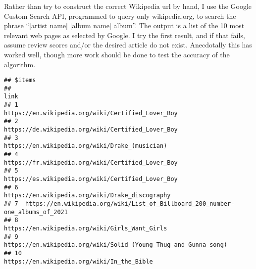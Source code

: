 \documentclass[
  11pt,
]{article}
\newenvironment{Shaded}{\begin{snugshade}}{\end{snugshade}}
\newcommand{\FunctionTok}[1]{\textcolor[rgb]{0.00,0.00,0.00}{#1}}
\newcommand{\NormalTok}[1]{#1}
\newcommand{\OtherTok}[1]{\textcolor[rgb]{0.56,0.35,0.01}{#1}}
\newcommand{\SpecialCharTok}[1]{\textcolor[rgb]{0.00,0.00,0.00}{#1}}
\newcommand{\StringTok}[1]{\textcolor[rgb]{0.31,0.60,0.02}{#1}}
\begin{document}
Rather than try to construct the correct Wikipedia url by hand, I use
the Google Custom Search API, programmed to query only wikipedia.org, to
search the phrase ``{[}artist name{]} {[}album name{]} album''. The
output is a list of the 10 most relevant web pages as selected by
Google. I try the first result, and if that fails, assume review scores
and/or the desired article do not exist. Anecdotally this has worked
well, though more work should be done to test the accuracy of the
algorithm.

\begin{Shaded}
\end{Shaded}

\begin{verbatim}
## $items
##                                                                             link
## 1                              https://en.wikipedia.org/wiki/Certified_Lover_Boy
## 2                              https://de.wikipedia.org/wiki/Certified_Lover_Boy
## 3                                 https://en.wikipedia.org/wiki/Drake_(musician)
## 4                              https://fr.wikipedia.org/wiki/Certified_Lover_Boy
## 5                              https://es.wikipedia.org/wiki/Certified_Lover_Boy
## 6                                https://en.wikipedia.org/wiki/Drake_discography
## 7  https://en.wikipedia.org/wiki/List_of_Billboard_200_number-one_albums_of_2021
## 8                                 https://en.wikipedia.org/wiki/Girls_Want_Girls
## 9                https://en.wikipedia.org/wiki/Solid_(Young_Thug_and_Gunna_song)
## 10                                    https://en.wikipedia.org/wiki/In_the_Bible
\end{verbatim}
\end{document}
